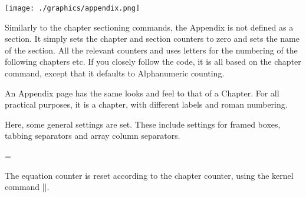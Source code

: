 \begin{multicols}{2}
\texttt{[image: ./graphics/appendix.png]}

Similarly to the chapter sectioning commands, the Appendix is not defined as a section. It simply sets the chapter and section counters to zero and sets the name of the section. All the relevant counters and uses letters for the numbering of the following chapters etc. If you closely follow the code, it is all based on the chapter command, except that it defaults to Alphanumeric counting.

\begin{teX}
\newcommand\appendix{\par
  \setcounter{chapter}{0}%
  \setcounter{section}{0}%
  \gdef\@chapapp{\appendixname}(*@\sidenote{The actual literal used for \textbackslash{appendixname} is defined later on, so that you can customize the language}\label{appendixname}@*)
  \gdef\thechapter{\@Alph\c@chapter}}
\end{teX}

An Appendix page has the same looks and feel to that of a Chapter. For all practical purposes, it is a chapter, with different labels and roman numbering.
\end{multicols}

\begin{multicols}{2}
 Here, some general settings are set. These include settings for framed boxes, tabbing separators and array column separators.

\end{multicols}
\begin{teX}
\setlength{}
\setlength{}
\setlength{}
\setlength{}
\setlength{}
\skip\@mpfootins = \skip\footins
\setlength{}
\setlength{}
\end{teX}

\begin{multicols}{2}
The equation counter is reset according to the chapter counter, using the \latex kernel command |\@addtoreset|. 

\end{multicols}
\begin{teX}
\renewcommand\theequation
  {\ifnum \c@chapter>\z@ \thechapter.\fi \@arabic\c@equation}
\end{teX}


